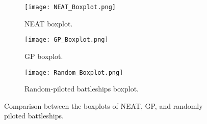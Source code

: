 \begin{figure*}
    \centering
    \begin{subfigure}[b]{0.3\textwidth}
        \centering
        \texttt{[image: NEAT\_Boxplot.png]}
        \caption{NEAT boxplot.}
    \end{subfigure}
    \hspace{3mm}
    \begin{subfigure}[b]{0.3\textwidth}
        \centering
        \texttt{[image: GP\_Boxplot.png]}
        \caption{GP boxplot.}
    \end{subfigure}
    \hspace{3mm}
    \begin{subfigure}[b]{0.3\textwidth}
        \centering
        \texttt{[image: Random\_Boxplot.png]}
        \caption{Random-piloted battleships boxplot.}
        \label{fig:random_boxplot}
    \end{subfigure}
       \caption{Comparison between the boxplots of NEAT, GP, and randomly piloted battleships.}
       \label{fig:boxplots}
\end{figure*}\
